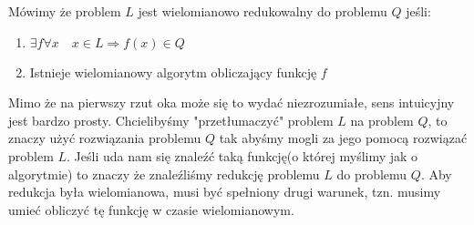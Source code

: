 \begin{definition}
Mówimy że problem $L$ jest wielomianowo redukowalny do problemu $Q$ jeśli:
\begin{enumerate}
\item $\exists f \forall x \quad  x \in L \Rightarrow f(x) \in Q$
\item Istnieje wielomianowy algorytm obliczający funkcję $f$
\end{enumerate}
\end{definition}
\noindent
Mimo że na pierwszy rzut oka może się to wydać niezrozumiałe, sens intuicyjny jest bardzo prosty. 
Chcielibyśmy "przetłumaczyć" problem $L$ na problem $Q$, to znaczy użyć rozwiązania problemu $Q$ tak abyśmy mogli za jego pomocą rozwiązać problem $L$. 
Jeśli uda nam się znaleźć taką funkcję(o której myślimy jak o algorytmie) to znaczy że znaleźliśmy redukcję problemu $L$ do problemu $Q$. 
Aby redukcja była wielomianowa, musi być spełniony drugi warunek, tzn. musimy umieć obliczyć tę funkcję w czasie wielomianowym.

